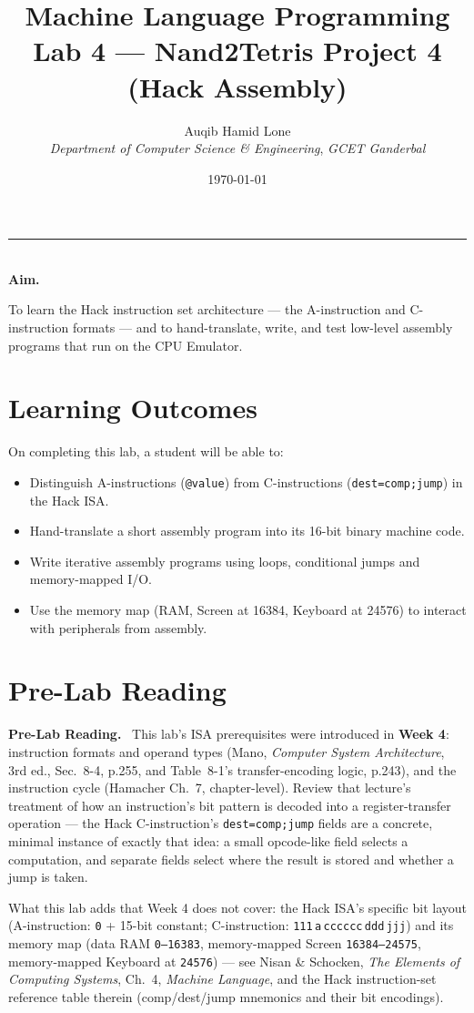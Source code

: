\documentclass[11pt]{article}
\title{Machine Language Programming\\\large Lab 4 --- Nand2Tetris Project 4 (Hack Assembly)}
\author{Auqib Hamid Lone\\[0.3em]
  \emph{Department of Computer Science \& Engineering}, \emph{GCET Ganderbal}}
\date{\today}
\newenvironment{aimbox}{%
  \par\noindent\begin{minipage}{\linewidth}\vspace{0.4em}
  \textcolor{primary-blue}{\rule{\linewidth}{0.8pt}}\\[0.3em]
  \textbf{\textcolor{primary-blue}{Aim.}}\ \itshape
}{%
  \end{minipage}\vspace{0.4em}\par
}
\newenvironment{tocitebox}{%
  \par\noindent\textbf{\textcolor{primary-gold}{Pre-Lab Reading.}}\
}{\par\vspace{0.3em}}
\begin{document}
\maketitle

\begin{aimbox}
To learn the Hack instruction set architecture --- the A-instruction and C-instruction formats --- and to hand-translate, write, and test low-level assembly programs that run on the CPU Emulator.
\end{aimbox}

\section{Learning Outcomes}

On completing this lab, a student will be able to:
\begin{itemize}
  \item Distinguish A-instructions (\texttt{@value}) from C-instructions (\texttt{dest=comp;jump}) in the Hack ISA.
  \item Hand-translate a short assembly program into its 16-bit binary machine code.
  \item Write iterative assembly programs using loops, conditional jumps and memory-mapped I/O.
  \item Use the memory map (RAM, Screen at 16384, Keyboard at 24576) to interact with peripherals from assembly.
\end{itemize}

\section{Pre-Lab Reading}

\begin{tocitebox}
This lab's ISA prerequisites were introduced in \textbf{Week 4}: instruction formats and operand types (Mano, \emph{Computer System Architecture}, 3rd ed., Sec.~8-4, p.255, and Table~8-1's transfer-encoding logic, p.243), and the instruction cycle (Hamacher Ch.~7, chapter-level). Review that lecture's treatment of how an instruction's bit pattern is decoded into a register-transfer operation --- the Hack C-instruction's \texttt{dest=comp;jump} fields are a concrete, minimal instance of exactly that idea: a small opcode-like field selects a computation, and separate fields select where the result is stored and whether a jump is taken.

\smallskip
\noindent What this lab adds that Week 4 does not cover: the Hack ISA's specific bit layout (A-instruction: \texttt{0} + 15-bit constant; C-instruction: \texttt{111}\,\texttt{a}\,\texttt{cccccc}\,\texttt{ddd}\,\texttt{jjj}) and its memory map (data RAM \texttt{0--16383}, memory-mapped Screen \texttt{16384--24575}, memory-mapped Keyboard at \texttt{24576}) --- see Nisan \& Schocken, \emph{The Elements of Computing Systems}, Ch.~4, \emph{Machine Language}, and the Hack instruction-set reference table therein (comp/dest/jump mnemonics and their bit encodings).
\end{tocitebox}
\end{document}
